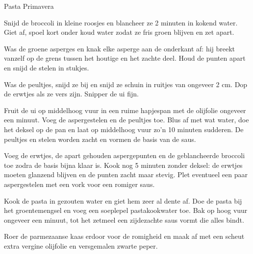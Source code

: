 \begin{recipe}{Pasta Primavera}
\begin{steps}
  \item Snijd de broccoli in kleine roosjes en blancheer ze 2 minuten in
        kokend water. Giet af, spoel kort onder koud water zodat ze fris
        groen blijven en zet apart.
  \item Was de groene asperges en knak elke asperge aan de onderkant af: hij breekt vanzelf op de
        grens tussen het houtige en het zachte deel. Houd de punten apart en
        snijd de stelen in stukjes.
  \item Was de peultjes, snijd ze bij en snijd ze schuin in ruitjes van ongeveer 2 cm.
        Dop de erwtjes als ze vers zijn. Snipper de ui fijn.
  \item Fruit de ui op middelhoog vuur in een ruime hapjespan met de olijfolie
        ongeveer een minuut. Voeg de
        aspergestelen en de peultjes toe. Blus af met wat water, doe het
        deksel op de pan en laat op middelhoog vuur zo'n 10 minuten
        sudderen. De peultjes en stelen worden zacht en vormen de basis van
        de saus.
  \item Voeg de erwtjes, de apart gehouden aspergepunten en de
        geblancheerde broccoli toe zodra de basis bijna klaar is. Kook nog
        5 minuten zonder deksel: de erwtjes moeten glanzend blijven en de
        punten zacht maar stevig. Plet eventueel een paar aspergestelen met
        een vork voor een romiger saus.
  \item Kook de pasta in gezouten water en giet hem zeer al dente af. Doe de
        pasta bij het groentemengsel en voeg een soeplepel pastakookwater
        toe. Bak op hoog vuur ongeveer een minuut, tot het zetmeel een
        zijdezachte saus vormt die alles bindt.
  \item Roer de parmezaanse kaas erdoor voor de romigheid en maak af met een
        scheut extra vergine olijfolie en versgemalen zwarte peper.
\end{steps}
\end{recipe}
